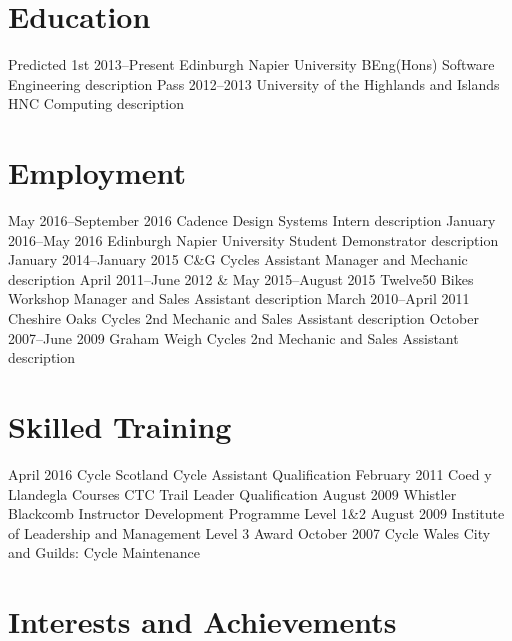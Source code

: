 \documentclass{moderncv}
\begin{document}
\makecvtitle	
\section{Education}
	\cventry
		{Predicted 1st}
		{2013--Present}
		{Edinburgh Napier University}
		{BEng(Hons) Software Engineering}
		{}
		{description}
	\cventry
		{Pass}
		{2012--2013}
		{University of the Highlands and Islands}
		{HNC Computing}
		{}
		{description}
\section{Employment}
	\cventry
		{}
		{May 2016--September 2016}
		{Cadence Design Systems}
		{Intern}
		{}
		{description}
	\cventry
		{}
		{January 2016--May 2016}
		{Edinburgh Napier University}
		{Student Demonstrator}
		{}
		{description}
	\cventry
		{}
		{January 2014--January 2015}
		{C\&G Cycles}
		{Assistant Manager and Mechanic}
		{}
		{description}
	\cventry
		{}
		{April 2011--June 2012 \& May 2015--August 2015}
		{Twelve50 Bikes}
		{Workshop Manager and Sales Assistant}
		{}
		{description}
	\cventry
		{}
		{March 2010--April 2011}
		{Cheshire Oaks Cycles}
		{2nd Mechanic and Sales Assistant}
		{}
		{description}
	\cventry
		{}
		{October 2007--June 2009}
		{Graham Weigh Cycles}
		{2nd Mechanic and Sales Assistant}
		{}
		{description}
\newpage
\section{Skilled Training}
	\cventry
		{}
		{April 2016}
		{Cycle Scotland}
		{Cycle Assistant Qualification}
		{}
		{}
	\cventry
		{}
		{February 2011}
		{Coed y Llandegla Courses}
		{CTC Trail Leader Qualification}
		{}
		{}
	\cventry
		{}
		{August 2009}
		{Whistler Blackcomb}
		{Instructor Development Programme Level 1\&2}
		{}
		{}
	\cventry
		{}
		{August 2009}
		{Institute of Leadership and Management}
		{Level 3 Award}
		{}
		{}
	\cventry
		{}
		{October 2007}
		{Cycle Wales}
		{City and Guilds: Cycle Maintenance}
		{}
		{}
\section{Interests and Achievements}
\end{document}

